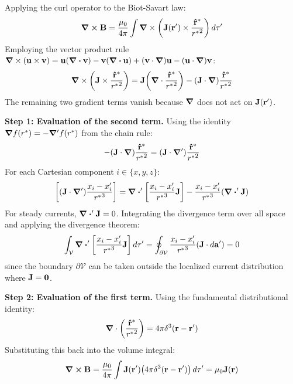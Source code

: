 \begin{proofbox}
Applying the curl operator to the Biot-Savart law:
\begin{equation}
    \curl\vb{B} = \frac{\mu_0}{4\pi} \int \grad \times \qty(\vb{J}(\vb{r}') \times \frac{\vu{r}^*}{{r^*}^2})\,d\tau'
\end{equation}
Employing the vector product rule $\grad \times (\vb{u} \times \vb{v}) = \vb{u}(\div\vb{v}) - \vb{v}(\div\vb{u}) + (\vb{v}\cdot\grad)\vb{u} - (\vb{u}\cdot\grad)\vb{v}$:
\begin{equation}
    \grad \times \qty(\vb{J} \times \frac{\vu{r}^*}{{r^*}^2}) = \vb{J}\qty(\grad \cdot \frac{\vu{r}^*}{{r^*}^2}) - \qty(\vb{J} \cdot \grad)\frac{\vu{r}^*}{{r^*}^2}
\end{equation}
The remaining two gradient terms vanish because $\grad$ does not act on $\vb{J}(\vb{r}')$.

\textbf{Step 1: Evaluation of the second term.}
Using the identity $\grad f(r^*) = -\grad' f(r^*)$ from the chain rule:
\begin{equation}
    -(\vb{J} \cdot \grad)\frac{\vu{r}^*}{{r^*}^2} = (\vb{J} \cdot \grad')\frac{\vu{r}^*}{{r^*}^2}
\end{equation}
For each Cartesian component $i \in \{x,y,z\}$:
\begin{equation}
    \qty[(\vb{J} \cdot \grad')\frac{x_i - x_i'}{{r^*}^3}] = \div'\qty[\frac{x_i - x_i'}{{r^*}^3} \vb{J}] - \frac{x_i - x_i'}{{r^*}^3}\qty(\div'\vb{J})
\end{equation}
For steady currents, $\div'\vb{J} = 0$. Integrating the divergence term over all space and applying the divergence theorem:
\begin{equation}
    \int_{\mathcal{V}} \div'\qty[\frac{x_i - x_i'}{{r^*}^3} \vb{J}]\,d\tau' = \oint_{\partial \mathcal{V}} \frac{x_i - x_i'}{{r^*}^3} (\vb{J} \cdot d\vb{a}') = 0
\end{equation}
since the boundary $\partial\mathcal{V}$ can be taken outside the localized current distribution where $\vb{J} = \vb{0}$.

\textbf{Step 2: Evaluation of the first term.}
Using the fundamental distributional identity:
\begin{equation}
    \grad \cdot \qty(\frac{\vu{r}^*}{{r^*}^2}) = 4\pi \delta^3(\vb{r} - \vb{r}')
\end{equation}
Substituting this back into the volume integral:
\begin{equation}
    \curl\vb{B} = \frac{\mu_0}{4\pi} \int \vb{J}(\vb{r}') \qty(4\pi \delta^3(\vb{r} - \vb{r}'))\,d\tau' = \mu_0 \vb{J}(\vb{r})
\end{equation}
\end{proofbox}

